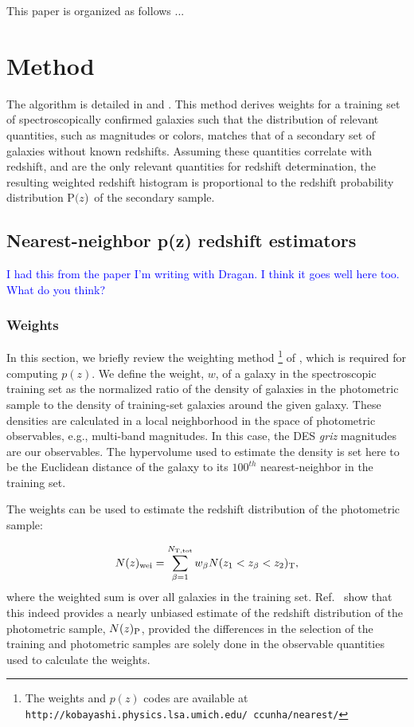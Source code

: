\documentclass{emulateapj}
\newcommand{\pofz}{P$(z$)}
\newcommand{\nwei}{N(z)_{\rm wei}}
\begin{document}
This paper is organized as follows ...

\section{Method} \label{sec:method}

The algorithm is detailed in \citet{LimaPhotoz08} and \citet{CunhaPhotoz09}.
This method derives weights for a training set of spectroscopically confirmed
galaxies such that the distribution of relevant quantities, such as magnitudes
or colors, matches that of a secondary set of galaxies without known redshifts.
Assuming these quantities correlate with redshift, and are the only relevant
quantities for redshift determination, the resulting weighted redshift
histogram is proportional to the redshift probability distribution \pofz\ of the
secondary sample. 


\subsection{Nearest-neighbor p(z) redshift estimators}\label{sec:nnpz}

\textcolor{blue}{I had this from the paper I'm writing with Dragan. I think it goes well here too. What do you think?}

\subsubsection{Weights}

In this section, we briefly review the weighting method \footnote{The weights and $p(z)$ 
codes are available at \tt http://kobayashi.physics.lsa.umich.edu/~ccunha/nearest/} of \cite{LimaPhotoz08}, which
is required for computing $p(z)$.  We define the weight, $w$, of a galaxy in
the spectroscopic training set as the normalized ratio of the density of
galaxies in the photometric sample to the density of training-set galaxies
around the given galaxy.  These densities are calculated in a local
neighborhood in the space of photometric observables, e.g., multi-band
magnitudes.  In this case, the DES {\it griz} magnitudes are our observables.
The hypervolume used to estimate the density is set here to be the Euclidean
distance of the galaxy to its $100^{th}$ nearest-neighbor in the training set.

The weights can be used to estimate the redshift distribution of the photometric sample:

\begin{equation}  
\nwei   = \sum_{\beta=1}^{N_{\rm T,tot}} w_\beta N(z_1<z_\beta<z_2)_{\rm T},
\label{eqn:Nzest}
\end{equation}
\noindent where the weighted sum is over all galaxies in the training
set. Ref.~\cite{LimaPhotoz08,CunhaPhotoz09} show that this indeed provides a nearly unbiased estimate of
the redshift distribution of the photometric sample, $N(z)_{\rm P}$, provided
the differences in the selection of the training and photometric samples are
solely done in the observable quantities used to calculate the weights.
\end{document}
